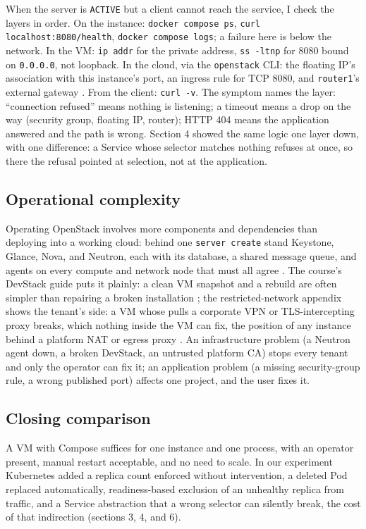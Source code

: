 \documentclass[11pt,letterpaper]{article}
\newcommand{\code}[1]{\texttt{#1}}
\begin{document}
When the server is \code{ACTIVE} but a client cannot reach the service, I check the layers in order. On the instance: \code{docker compose ps}, \code{curl localhost:8080/health}, \code{docker compose logs}; a failure here is below the network. In the VM: \code{ip addr} for the private address, \code{ss -ltnp} for 8080 bound on \code{0.0.0.0}, not loopback. In the cloud, via the \code{openstack} CLI: the floating IP's association with this instance's port, an ingress rule for TCP 8080, and \code{router1}'s external gateway \cite{ex05,os-secgroups}. From the client: \code{curl -v}. The symptom names the layer: ``connection refused'' means nothing is listening; a timeout means a drop on the way (security group, floating IP, router); HTTP 404 means the application answered and the path is wrong. Section 4 showed the same logic one layer down, with one difference: a Service whose selector matches nothing refuses at once, so there the refusal pointed at selection, not at the application.

\subsection{Operational complexity}

Operating OpenStack involves more components and dependencies than deploying into a working cloud: behind one \code{server create} stand Keystone, Glance, Nova, and Neutron, each with its database, a shared message queue, and agents on every compute and network node that must all agree \cite{os-keystone,os-glance,os-nova,os-neutron}. The course's DevStack guide puts it plainly: a clean VM snapshot and a rebuild are often simpler than repairing a broken installation \cite{ex05devstack}; the restricted-network appendix shows the tenant's side: a VM whose pulls a corporate VPN or TLS-intercepting proxy breaks, which nothing inside the VM can fix, the position of any instance behind a platform NAT or egress proxy \cite{restricted}. An infrastructure problem (a Neutron agent down, a broken DevStack, an untrusted platform CA) stops every tenant and only the operator can fix it; an application problem (a missing security-group rule, a wrong published port) affects one project, and the user fixes it.

\subsection{Closing comparison}

A VM with Compose suffices for one instance and one process, with an operator present, manual restart acceptable, and no need to scale. In our experiment Kubernetes added a replica count enforced without intervention, a deleted Pod replaced automatically, readiness-based exclusion of an unhealthy replica from traffic, and a Service abstraction that a wrong selector can silently break, the cost of that indirection (sections 3, 4, and 6).
\end{document}
